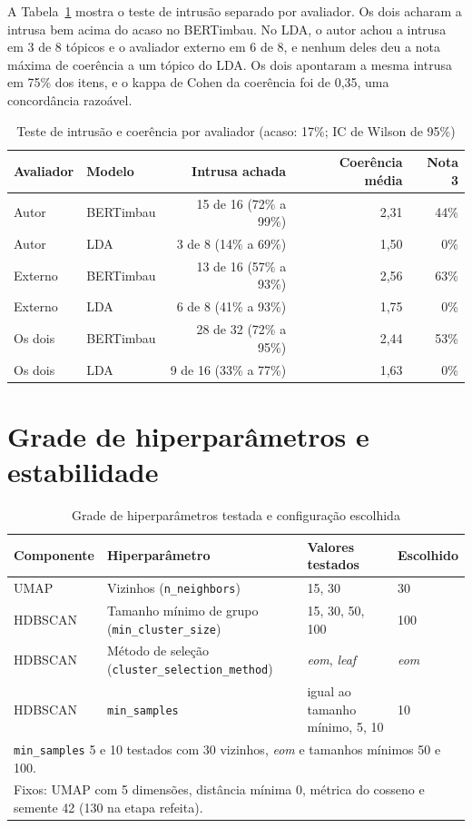 \documentclass[12pt]{article}
\newcommand{\tabfont}{\fontsize{9}{11}\selectfont\setlength{\tabcolsep}{2.5pt}}
\begin{document}
A Tabela~\ref{tab:avaliacao} mostra o teste de intrusão separado por avaliador. Os dois acharam a intrusa bem acima do acaso no BERTimbau. No LDA, o autor achou a intrusa em 3 de 8 tópicos e o avaliador externo em 6 de 8, e nenhum deles deu a nota máxima de coerência a um tópico do LDA. Os dois apontaram a mesma intrusa em 75\% dos itens, e o kappa de Cohen da coerência foi de 0,35, uma concordância razoável.

\begin{table}[H]
\centering
\caption{Teste de intrusão e coerência por avaliador (acaso: 17\%; IC de Wilson de 95\%)}
\label{tab:avaliacao}
\tabfont
\begin{tabular}{l l r r r}
\toprule
\textbf{Avaliador} & \textbf{Modelo} & \textbf{Intrusa achada} & \textbf{Coerência média} & \textbf{Nota 3} \\
\midrule
Autor & BERTimbau & 15 de 16 (72\% a 99\%) & 2,31 & 44\% \\
Autor & LDA & 3 de 8 (14\% a 69\%) & 1,50 & 0\% \\
Externo & BERTimbau & 13 de 16 (57\% a 93\%) & 2,56 & 63\% \\
Externo & LDA & 6 de 8 (41\% a 93\%) & 1,75 & 0\% \\
\midrule
Os dois & BERTimbau & 28 de 32 (72\% a 95\%) & 2,44 & 53\% \\
Os dois & LDA & 9 de 16 (33\% a 77\%) & 1,63 & 0\% \\
\bottomrule
\end{tabular}
\end{table}

\clearpage
\section{Grade de hiperparâmetros e estabilidade}
\label{app:grade}

\begin{table}[H]
\centering
\caption{Grade de hiperparâmetros testada e configuração escolhida}
\label{tab:grade}
\tabfont
\begin{tabular}{l l l l}
\toprule
\textbf{Componente} & \textbf{Hiperparâmetro} & \textbf{Valores testados} & \textbf{Escolhido} \\
\midrule
UMAP    & Vizinhos (\texttt{n\_neighbors}) & 15, 30 & 30 \\
HDBSCAN & Tamanho mínimo de grupo (\texttt{min\_cluster\_size}) & 15, 30, 50, 100 & 100 \\
HDBSCAN & Método de seleção (\texttt{cluster\_selection\_method}) & \textit{eom}, \textit{leaf} & \textit{eom} \\
HDBSCAN & \texttt{min\_samples} & igual ao tamanho mínimo, 5, 10 & 10 \\
\midrule
\multicolumn{4}{l}{\texttt{min\_samples} 5 e 10 testados com 30 vizinhos, \textit{eom} e tamanhos mínimos 50 e 100.} \\
\multicolumn{4}{l}{Fixos: UMAP com 5 dimensões, distância mínima 0, métrica do cosseno e semente 42 (130 na etapa refeita).} \\
\bottomrule
\end{tabular}
\end{table}
\end{document}
